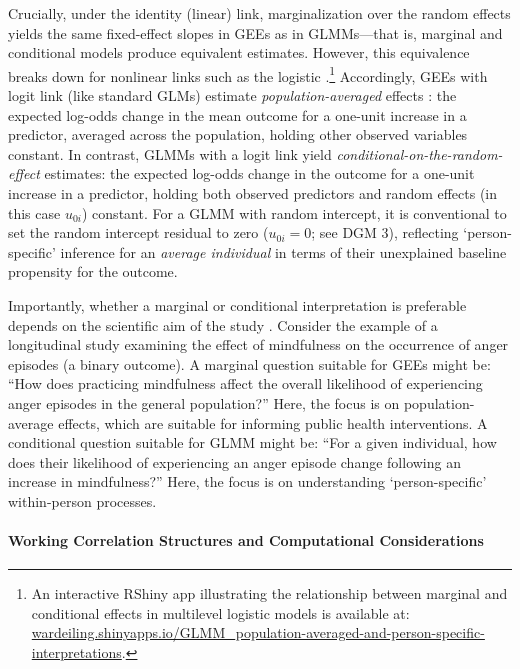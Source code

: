 \documentclass[stu]{apa7}
\begin{document}
Crucially, under the identity (linear) link, marginalization over the random effects yields the same fixed-effect slopes in GEEs as in GLMMs—that is, marginal and conditional models produce equivalent estimates. However, this equivalence breaks down for nonlinear links such as the logistic \parencite[]{neuhaus_comparison_1991}.\footnote{An interactive RShiny app illustrating the relationship between marginal and conditional effects in multilevel logistic models is available at: \href{https://wardeiling.shinyapps.io/GLMM_population-averaged-and-person-specific-interpretations/}{wardeiling.shinyapps.io/GLMM\_population-averaged-and-person-specific-interpretations}.} Accordingly, GEEs with logit link (like standard GLMs) estimate \textit{population-averaged} effects \parencite{diggle_analysis_2002}: the expected log-odds change in the mean outcome for a one-unit increase in a predictor, averaged across the population, holding other observed variables constant. In contrast, GLMMs with a logit link yield \textit{conditional-on-the-random-effect} estimates: the expected log-odds change in the outcome for a one-unit increase in a predictor, holding both observed predictors and random effects (in this case \( u_{0i} \)) constant. For a GLMM with random intercept, it is conventional to set the random intercept residual to zero (\( u_{0i} = 0 \); see DGM 3), reflecting `person-specific' inference for an \textit{average individual} in terms of their unexplained baseline propensity for the outcome.

Importantly, whether a marginal or conditional interpretation is preferable depends on the scientific aim of the study \parencite[]{neuhaus_comparison_1991, diggle_analysis_2002}. Consider the example of a longitudinal study examining the effect of mindfulness on the occurrence of anger episodes (a binary outcome). A marginal question suitable for GEEs might be: ``How does practicing mindfulness affect the overall likelihood of experiencing anger episodes in the general population?'' Here, the focus is on population-average effects, which are suitable for informing public health interventions. A conditional question suitable for GLMM might be: ``For a given individual, how does their likelihood of experiencing an anger episode change following an increase in mindfulness?'' Here, the focus is on understanding `person-specific' within-person processes.

\paragraph{Working Correlation Structures and Computational Considerations} 
\end{document}
